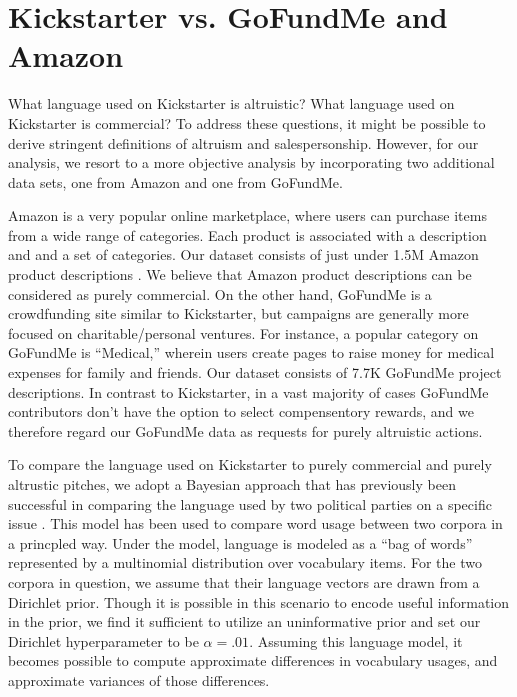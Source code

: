 \documentclass[letterpaper]{article}
\begin{document}
\section{Kickstarter vs. GoFundMe and Amazon}
What language used on Kickstarter is altruistic? What language used on Kickstarter is commercial? To address these questions, it might be possible to derive stringent definitions of altruism and salespersonship. However, for our analysis, we resort to a more objective analysis by incorporating two additional data sets, one from Amazon and one from GoFundMe.

Amazon is a very popular online marketplace, where users can purchase items from a wide range of categories. Each product is associated with a description and and a set of categories. Our dataset consists of just under 1.5M Amazon product descriptions \cite{mcauley2013hidden}. We believe that Amazon product descriptions can be considered as purely commercial. On the other hand, GoFundMe is a crowdfunding site similar to Kickstarter, but campaigns are generally more focused on charitable/personal ventures. For instance, a popular category on GoFundMe is ``Medical,'' wherein users create pages to raise money for medical expenses for family and friends. Our dataset consists of 7.7K GoFundMe project descriptions. In contrast to Kickstarter, in a vast majority of cases GoFundMe contributors don't have the option to select compensentory rewards, and we therefore regard our GoFundMe data as requests for purely altruistic actions.

To compare the language used on Kickstarter to purely commercial and purely altrustic pitches, we adopt a Bayesian approach that has previously been successful in comparing the language used by two political parties on a specific issue \cite{monroe2008fightin}. This model has been used to compare word usage between two corpora in a princpled way. Under the model, language is modeled as a ``bag of words'' represented by a multinomial distribution over vocabulary items. For the two corpora in question, we assume that their language vectors are drawn from a Dirichlet prior. Though it is possible in this scenario to encode useful information in the prior, we find it sufficient to utilize an uninformative prior and set our Dirichlet hyperparameter to be $\alpha=.01$. Assuming this language model, it becomes possible to compute approximate differences in vocabulary usages, and approximate variances of those differences.
\end{document}
